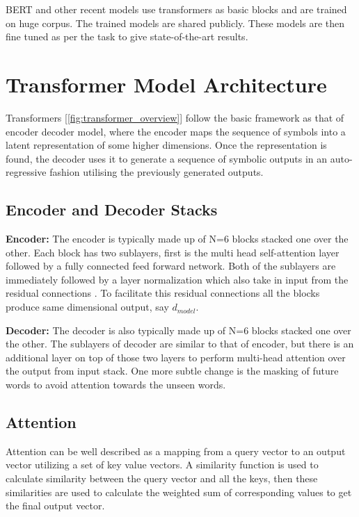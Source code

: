 \documentclass{article}
\begin{document}
BERT \cite{devlin-etal-2019-bert} and other recent models use transformers as basic blocks and are trained on huge corpus. The trained models are shared publicly. These models are then fine tuned as per the task to give state-of-the-art results.

\section{Transformer Model Architecture}
Transformers [\ref{fig:transformer_overview}] follow the basic framework as that of encoder decoder model, where the encoder maps the sequence of symbols into a latent representation of some higher dimensions. Once the representation is found, the decoder uses it to generate a sequence of symbolic outputs in an auto-regressive fashion utilising the previously generated outputs.

\subsection{Encoder and Decoder Stacks}

\textbf{Encoder:} The encoder is typically made up of N=6 blocks stacked one over the other. Each block has two sublayers, first is the multi head self-attention layer followed by a fully connected feed forward network. Both of the sublayers are immediately followed by a layer normalization \cite{ba2016layer} which also take in input from the residual connections \cite{DBLP:journals/corr/HeZRS15}. To facilitate this residual connections all the blocks produce same dimensional output, say $d_{model}$. 

\textbf{Decoder:} The decoder is also typically made up of N=6 blocks stacked one over the other. The sublayers of decoder are similar to that of encoder, but there is an additional layer on top of those two layers to perform multi-head attention over the output from input stack. One more subtle change is the masking of future words to avoid attention towards the unseen words.

\subsection{Attention}
Attention can be well described as a mapping from a query vector to an output vector utilizing a set of key value vectors. A similarity function is used to calculate similarity between the query vector and all the keys, then these similarities are used to calculate the weighted sum of corresponding values to get the final output vector.
\end{document}
